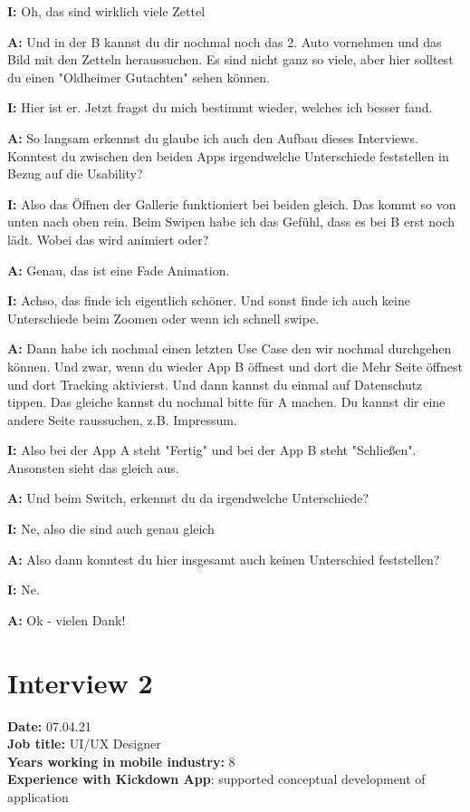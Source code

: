 \begin{myparindent}{0pt}
\textbf{I:} Oh, das sind wirklich viele Zettel 

\textbf{A:} Und in der B kannst du dir nochmal noch das 2. Auto vornehmen und das Bild mit den Zetteln  heraussuchen. Es sind nicht ganz so viele, aber hier solltest du einen "Oldheimer Gutachten" sehen können. 

\textbf{I:} Hier ist er. Jetzt fragst du mich bestimmt wieder, welches ich besser fand. 

\textbf{A:} So langsam erkennst du glaube ich auch den Aufbau dieses Interviews. Konntest du zwischen den beiden Apps irgendwelche Unterschiede feststellen in Bezug auf die Usability?

\textbf{I:} Also das Öffnen der Gallerie funktioniert bei beiden gleich. Das kommt so von unten nach oben rein. Beim Swipen habe ich das Gefühl, dass es bei  B erst noch lädt. Wobei das wird animiert oder?

\textbf{A:} Genau, das ist eine Fade Animation.

\textbf{I:} Achso, das finde ich eigentlich schöner. Und sonst finde ich auch keine Unterschiede beim Zoomen oder wenn ich schnell swipe. 

\textbf{A:} Dann habe ich nochmal einen letzten Use Case den wir nochmal durchgehen können. Und zwar, wenn du wieder App B öffnest und dort die Mehr Seite öffnest und dort Tracking aktivierst. Und dann kannst du einmal auf Datenschutz tippen. Das gleiche kannst du nochmal bitte für A machen. Du kannst dir eine andere Seite raussuchen, z.B. Impressum. 

\textbf{I:} Also bei der App A steht "Fertig" und bei der App B steht "Schließen". Ansonsten sieht das gleich aus.

\textbf{A:} Und beim Switch, erkennst du da irgendwelche Unterschiede?

\textbf{I:} Ne, also die sind auch genau gleich

\textbf{A:} Also dann konntest du hier insgesamt auch keinen Unterschied feststellen?

\textbf{I:} Ne.

\textbf{A:} Ok - vielen Dank!


\section{Interview 2}
\textbf{Date:} 07.04.21\\
\textbf{Job title:} UI/UX Designer\\
\textbf{Years working in mobile industry:} 8\\
\textbf{Experience with Kickdown App}: supported conceptual development of application\\


\end{myparindent}
